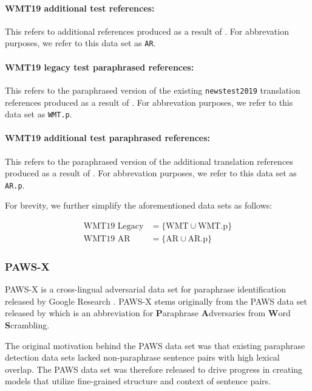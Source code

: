 \documentclass[11pt,a4paper]{article}
\begin{document}
\paragraph{WMT19 additional test references:} This refers to additional references produced as a result of \citet{freitag-bleu-paraphrase-references-2020}. For abbrevation purposes, we refer to this data set as \texttt{AR}. 

\paragraph{WMT19 legacy test paraphrased references:} This refers to the paraphrased version of the existing \texttt{newstest2019} translation references produced as a result of \citet{freitag-bleu-paraphrase-references-2020}. For abbrevation purposes, we refer to this data set as \texttt{WMT.p}. 

\paragraph{WMT19 additional test paraphrased references:}This refers to the paraphrased version of the additional translation references produced as a result of \citet{freitag-bleu-paraphrase-references-2020}. For abbrevation purposes, we refer to this data set as \texttt{AR.p}.

For brevity, we further simplify the aforementioned data sets as follows:

\vspace{-10pt}
\begin{align}
  \text{WMT19 Legacy} &= \{\text{WMT} \cup \text{WMT.p} \} \label{wmt19legacy} \\
  \text{WMT19 AR} &= \{\text{AR} \cup \text{AR.p} \} \label{wmt19ar}
\end{align}

\subsubsection{PAWS-X}

PAWS-X is a cross-lingual adversarial data set for paraphrase identification released by Google Research \citep{pawsx2019emnlp}. PAWS-X stems originally from the PAWS data set released by \citet{zhang2019paws} which is an abbreviation for \textbf{P}araphrase \textbf{A}dversaries from \textbf{W}ord \textbf{S}crambling.

The original motivation behind the PAWS data set was that existing paraphrase detection data sets lacked non-paraphrase sentence pairs with high lexical overlap. The PAWS data set was therefore released to drive progress in creating models that utilize fine-grained structure and context of sentence pairs.
\end{document}
